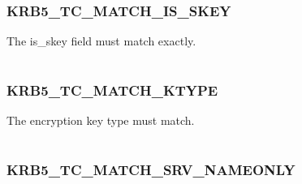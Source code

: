 \documentclass[letterpaper,10pt,english]{sphinxmanual}
\begin{document}
\subsubsection{KRB5\_TC\_MATCH\_IS\_SKEY}
\label{appdev/refs/macros/KRB5_TC_MATCH_IS_SKEY:krb5-tc-match-is-skey}\label{appdev/refs/macros/KRB5_TC_MATCH_IS_SKEY:krb5-tc-match-is-skey-data}\label{appdev/refs/macros/KRB5_TC_MATCH_IS_SKEY::doc}

\begin{fulllineitems}
\label{appdev/refs/macros/KRB5_TC_MATCH_IS_SKEY:KRB5_TC_MATCH_IS_SKEY}
\end{fulllineitems}


The is\_skey field must match exactly.

\begin{tabulary}{\linewidth}{|L|L|}
\hline

 & 
\\\hline
\end{tabulary}



\subsubsection{KRB5\_TC\_MATCH\_KTYPE}
\label{appdev/refs/macros/KRB5_TC_MATCH_KTYPE:krb5-tc-match-ktype}\label{appdev/refs/macros/KRB5_TC_MATCH_KTYPE:krb5-tc-match-ktype-data}\label{appdev/refs/macros/KRB5_TC_MATCH_KTYPE::doc}

\begin{fulllineitems}
\label{appdev/refs/macros/KRB5_TC_MATCH_KTYPE:KRB5_TC_MATCH_KTYPE}
\end{fulllineitems}


The encryption key type must match.

\begin{tabulary}{\linewidth}{|L|L|}
\hline

 & 
\\\hline
\end{tabulary}



\subsubsection{KRB5\_TC\_MATCH\_SRV\_NAMEONLY}
\label{appdev/refs/macros/KRB5_TC_MATCH_SRV_NAMEONLY::doc}\label{appdev/refs/macros/KRB5_TC_MATCH_SRV_NAMEONLY:krb5-tc-match-srv-nameonly}\label{appdev/refs/macros/KRB5_TC_MATCH_SRV_NAMEONLY:krb5-tc-match-srv-nameonly-data}
\end{document}
